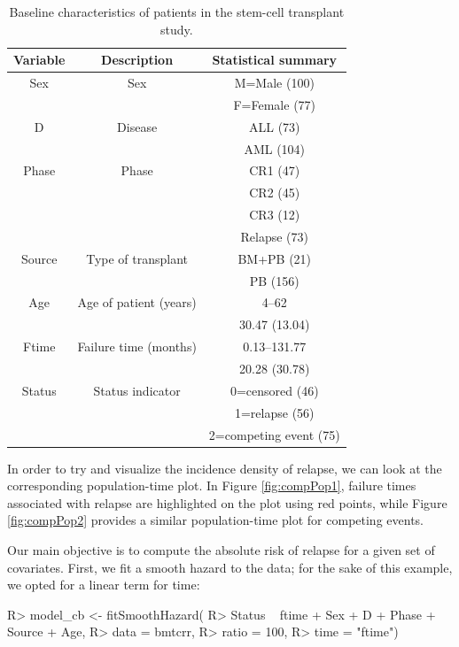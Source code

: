 \documentclass[
]{jss}
\begin{document}
\begin{table}[ht]
\centering
\begin{tabular}{ccc}
  \hline
Variable & Description & Statistical summary \\ 
  \hline
Sex & Sex & M=Male (100) \\ 
   &  & F=Female (77) \\ 
  D & Disease & ALL (73) \\ 
   &  & AML (104) \\ 
  Phase & Phase & CR1 (47) \\ 
   &  & CR2 (45) \\ 
   &  & CR3 (12) \\ 
   &  & Relapse (73) \\ 
  Source & Type of transplant & BM+PB (21) \\ 
   &  & PB (156) \\ 
  Age & Age of patient (years) & 4–62 \\ 
   &  & 30.47 (13.04) \\ 
  Ftime & Failure time (months) & 0.13–131.77 \\ 
   &  & 20.28 (30.78) \\ 
  Status & Status indicator & 0=censored (46) \\ 
   &  & 1=relapse (56) \\ 
   &  & 2=competing event (75) \\ 
   \hline
\end{tabular}
\caption{Baseline characteristics of patients in the stem-cell transplant study.}
\label{tab:table1bmtcrr}
\end{table}

In order to try and visualize the incidence density of relapse, we can
look at the corresponding population-time plot. In Figure
\ref{fig:compPop1}, failure times associated with relapse are
highlighted on the plot using red points, while Figure
\ref{fig:compPop2} provides a similar population-time plot for competing
events.

Our main objective is to compute the absolute risk of relapse for a
given set of covariates. First, we fit a smooth hazard to the data; for
the sake of this example, we opted for a linear term for time:

\begin{CodeChunk}

\begin{CodeInput}
R> model_cb <- fitSmoothHazard(
R>     Status ~ ftime + Sex + D + Phase + Source + Age, 
R>     data = bmtcrr, 
R>     ratio = 100, 
R>     time = "ftime")
\end{CodeInput}
\end{CodeChunk}
\end{document}
